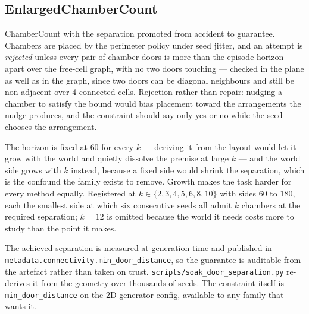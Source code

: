 \documentclass[11pt]{article}
\begin{document}
\subsection{EnlargedChamberCount}

ChamberCount with the separation promoted from accident to guarantee.
Chambers are placed by the perimeter policy under seed jitter, and an
attempt is \emph{rejected} unless every pair of chamber doors is more
than the episode horizon apart over the free-cell graph, with no two
doors touching --- checked in the plane as well as in the graph, since
two doors can be diagonal neighbours and still be non-adjacent over
4-connected cells. Rejection rather than repair: nudging a chamber to
satisfy the bound would bias placement toward the arrangements the
nudge produces, and the constraint should say only yes or no while the
seed chooses the arrangement.

The horizon is fixed at $60$ for every $k$ --- deriving it from the
layout would let it grow with the world and quietly dissolve the
premise at large $k$ --- and the world side grows with $k$ instead,
because a fixed side would shrink the separation, which is the
confound the family exists to remove. Growth makes the task harder for
every method equally. Registered at $k \in \{2,3,4,5,6,8,10\}$ with
sides $60$ to $180$, each the smallest side at which six consecutive
seeds all admit $k$ chambers at the required separation; $k=12$ is
omitted because the world it needs costs more to study than the point
it makes.

The achieved separation is measured at generation time and published
in \texttt{metadata.connectivity.min\_door\_distance}, so the
guarantee is auditable from the artefact rather than taken on trust.
\texttt{scripts/soak\_door\_separation.py} re-derives it from the
geometry over thousands of seeds. The constraint itself is
\texttt{min\_door\_distance} on the 2D generator config, available to
any family that wants it.
\end{document}
